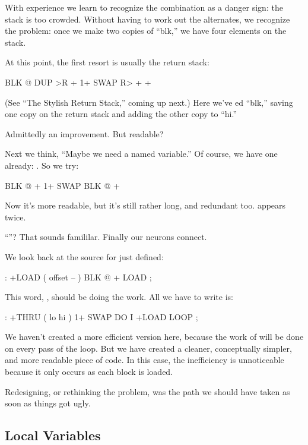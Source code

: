 With experience we learn to recognize the combination  as
a danger sign: the stack is too crowded. Without having to work out the
alternates, we recognize the problem: once we make two copies of ``blk,''
we have four elements on the stack.

\medbreak
At this point, the first resort is usually the return stack:

\begin{Code}
BLK @  DUP >R  + 1+  SWAP R> + +
\end{Code}
(See ``The Stylish Return Stack,'' coming up next.) Here we've ed
``blk,'' saving one copy on the return stack and adding the other copy to
``hi.''

Admittedly an improvement. But readable?

Next we think, ``Maybe we need a named variable.'' Of course, we
have one already: . So we try:

\begin{Code}
BLK @  + 1+  SWAP BLK @ +
\end{Code}
Now it's more readable, but it's still rather long, and redundant too.
 appears twice.

``''? That sounds famililar. Finally our neurons connect.

We look back at the source for  just defined:

\begin{Code}
: +LOAD  ( offset -- )  BLK @ +  LOAD ;
\end{Code}
This word, , should be doing the work. All we have to write is:

\begin{Code}
: +THRU  ( lo hi )  1+ SWAP  DO  I +LOAD  LOOP ;
\end{Code}
We haven't created a more efficient version here, because the work of
 will be done on every pass of the loop. But we have created a
cleaner, conceptually simpler, and more readable piece of code. In this
case, the inefficiency is unnoticeable because it only occurs as each block
is loaded.

Redesigning, or rethinking the problem, was the path we should
have taken as soon as things got ugly.%

\subsection{Local Variables}%
%
%

